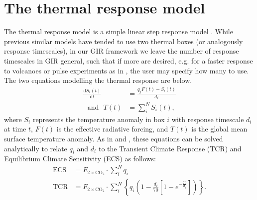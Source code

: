 \documentclass[gmd, manuscript]{copernicus}
\begin{document}
\section{The thermal response model}
The thermal response model is a simple linear step response model \citep{Good2011}. While previous similar models have tended to use two thermal boxes (or analogously response timescales), in our GIR framework we leave the number of response timescales in GIR general, such that if more are desired, e.g. for a faster response to volcanoes or pulse experiments as in \cite{Tsutsui2017}, the user may specify how many to use. The two equations modelling the thermal response are below.
\begin{align}
    \frac{\text{d}S_i(t)}{\text{d}t} &= \frac{q_jF(t) - S_i(t)}{d_i} \label{eq_thermbox}\\
    \text{~~and~~}T(t) &= \sum_{i}^{N}S_i(t), \label{eq_temp}
\end{align}
where $S_i$ represents the temperature anomaly in box $i$ with response timescale $d_i$ at time $t$, $F(t)$ is the effective radiative forcing, and $T(t)$ is the global mean surface temperature anomaly. As in \cite{Millar2016} and \cite{Tsutsui2017}, these equations can be solved analytically to relate $q_i$ and $d_i$ to the Transient Climate Response (TCR) and Equilibrium Climate Sensitivity (ECS) \citep{Collins2013} as follows:
\begin{align}
    \text{ECS}&=F_{2\times \text{CO}_2} \cdot \sum_i^N q_i \label{eq_ECS}\\
    \text{TCR}&=F_{2\times \text{CO}_2} \cdot \sum_i^N \left\{q_i\left(1-\frac{d_i}{70}\left[1-e^{-\frac{70}{d_i}}\right]\right)\right\}. \label{eq_TCR}
\end{align}
\end{document}
